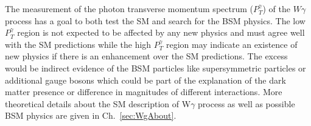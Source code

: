 The measurement of the photon transverse momentum spectrum ($P_T^{\gamma}$) of the $W\gamma$ process has a goal to both test the SM and search for the BSM physics. The low $P_T^{\gamma}$ region is not expected to be affected by any new physics and must agree well with the SM predictions while the high $P_T^{\gamma}$ region may indicate an existence of new physics if there is an enhancement over the SM predictions. The excess would be indirect evidence of the BSM particles like supersymmetric particles or additional gauge bosons which could be part of the explanation of the dark matter presence or difference in magnitudes of different interactions. More theoretical details about the SM description of W$\gamma$ process as well as possible BSM physics are given in Ch.~\ref{sec:WgAbout}. \\   


